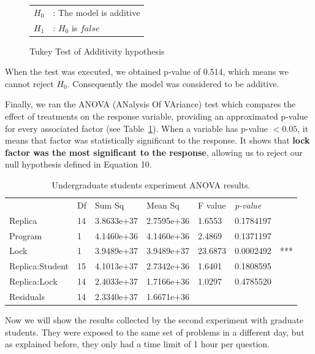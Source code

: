 \begin{figure}
\centering
\begin{tabular}{ll}
$H_{0}$ & : The model is additive \\
$H_{1}$ & : $H_{0}$ is $false$ \\
\end{tabular}
\caption{Tukey Test of Additivity hypothesis}\label{tab:tukey}
\end{figure}

When the test was executed, we obtained p-value of 0.514, which means we cannot reject $H_{0}$.
Consequently the model was considered to be additive.

Finally, we ran the ANOVA (ANalysis Of VAriance) test which compares the effect of treatments on the response variable,
providing an approximated p-value for every associated factor (see Table~\ref{tab:anova1}).
When a variable has p-value $< 0.05$, it means that factor was statistically significant to the response.
It shows that {\bf lock factor was the most significant to the response}, allowing us to reject our null hypothesis defined in Equation 10.

\begin{table}
\begin{center}
\caption{Undergraduate students experiment ANOVA results.}\label{tab:anova1}
\begin{tabular}{|l|l|l|l|l|ll|}
\hline
                & Df &    Sum Sq  &  Mean Sq   & F value & \emph{p-value} &     \\  
Replica         & 14 & 3.8633e+37 & 2.7595e+36 & 1.6553  & 0.1784197 &     \\   
Program         & 1  & 4.1460e+36 & 4.1460e+36 & 2.4869  & 0.1371197 &     \\   
Lock            & 1  & 3.9489e+37 & 3.9489e+37 & 23.6873 & 0.0002492 & *** \\
Replica:Student & 15 & 4.1013e+37 & 2.7342e+36 & 1.6401  & 0.1808595 &     \\  
Replica:Lock    & 14 & 2.4033e+37 & 1.7166e+36 & 1.0297  & 0.4785520 &     \\  
Residuals       & 14 & 2.3340e+37 & 1.6671e+36 &         &           &     \\
\hline
\end{tabular}
\end{center}
\end{table}

Now we will show the results collected by the second experiment with graduate students. They were exposed to the same set of problems in a different day, but as explained before, they only had a time limit of 1 hour per question.

